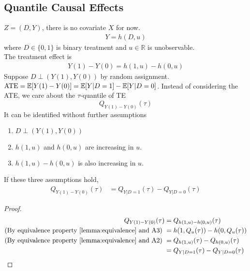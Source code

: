 \documentclass[11pt]{elegantbook}
\begin{document}
\subsection{Quantile Causal Effects}
$Z=(D,Y)$, there is no covariate $X$ for now.
\begin{equation}
    \begin{aligned}
        Y=h(D,u)
    \end{aligned}
    \nonumber
\end{equation}
where $D\in\{0,1\}$ is binary treatment and $u\in \mathbb{R}$ is unobservable.\\
The treatment effect is
\begin{equation}
    \begin{aligned}
        Y(1)-Y(0)=h(1,u)-h(0,u)
    \end{aligned}
    \nonumber
\end{equation}
Suppose $D\perp (Y(1),Y(0))$ by random assignment. $\textnormal{ATE}=\mathbb{E}[Y(1)-Y(0)]=\mathbb{E}[Y|D=1]-\mathbb{E}[Y|D=0]$. Instead of considering the ATE, we care about the $\tau$-quantile of TE $$Q_{Y(1)-Y(0)}(\tau)$$
It can be identified without further assumptions
\begin{assumption}
    \begin{enumerate}[{A}1.]
        \item $D\perp (Y(1),Y(0))$
        \item $h(1,u)$ and $h(0,u)$ are increasing in $u$.
        \item $h(1,u)-h(0,u)$ is also increasing in $u$.
    \end{enumerate}
\end{assumption}
\begin{theorem}
    If these three assumptions hold,
    \begin{equation}
        \begin{aligned}
            Q_{Y(1)-Y(0)}(\tau)&=Q_{Y|D=1}(\tau)-Q_{Y|D=0}(\tau)
        \end{aligned}
        \nonumber
    \end{equation}
\end{theorem}
\begin{proof}
    \begin{equation}
        \begin{aligned}
            Q_{Y(1)-Y(0)}(\tau)&=Q_{h(1,u)-h(0,u)}(\tau)\\
            \textnormal{(By equivalence property \ref{lemma:equivalence} and A3) }&=h(1,Q_u(\tau))-h(0,Q_u(\tau))\\
            \textnormal{(By equivalence property \ref{lemma:equivalence} and A2) }&=Q_{h(1,u)}(\tau)-Q_{h(0,u)}(\tau)\\
            &=Q_{Y|D=1}(\tau)-Q_{Y|D=0}(\tau)
        \end{aligned}
        \nonumber
    \end{equation}
\end{proof}
\end{document}
